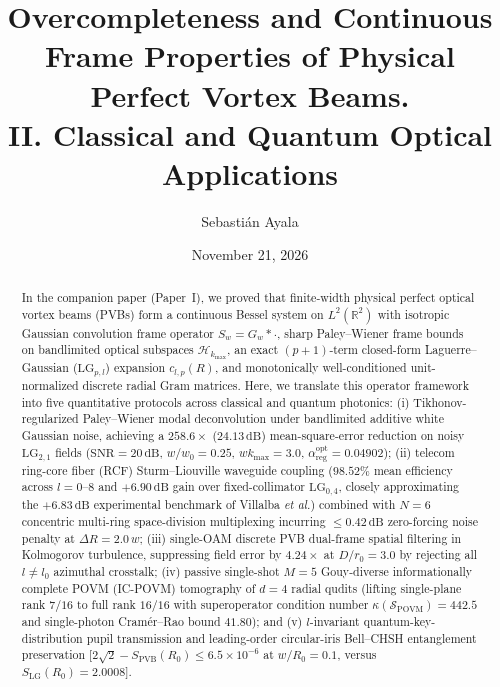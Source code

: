 \documentclass[aps,pra,reprint,nofootinbib,floatfix,longbibliography]{revtex4-2}
\begin{document}
\title{Overcompleteness and Continuous Frame Properties of Physical Perfect Vortex Beams.\\II. Classical and Quantum Optical Applications}

\author{Sebasti\'an Ayala}

\date{November 21, 2026}

\begin{abstract}
In the companion paper (Paper~I), we proved that finite-width physical perfect optical vortex beams (PVBs) form a continuous Bessel system on $L^2(\mathbb{R}^2)$ with isotropic Gaussian convolution frame operator $S_w = G_w * \cdot$, sharp Paley--Wiener frame bounds on bandlimited optical subspaces $\mathcal{H}_{k_{\max}}$, an exact $(p+1)$-term closed-form Laguerre--Gaussian ($\mathrm{LG}_{p,l}$) expansion $c_{l,p}(R)$, and monotonically well-conditioned unit-normalized discrete radial Gram matrices. Here, we translate this operator framework into five quantitative protocols across classical and quantum photonics: (i) Tikhonov-regularized Paley--Wiener modal deconvolution under bandlimited additive white Gaussian noise, achieving a $258.6\times$ ($24.13\,\mathrm{dB}$) mean-square-error reduction on noisy $\mathrm{LG}_{2,1}$ fields ($\mathrm{SNR} = 20\,\mathrm{dB}$, $w/w_0 = 0.25$, $w k_{\max} = 3.0$, $\alpha_{\mathrm{reg}}^{\mathrm{opt}} = 0.04902$); (ii) telecom ring-core fiber (RCF) Sturm--Liouville waveguide coupling ($98.52\%$ mean efficiency across $l = 0\text{--}8$ and $+6.90\,\mathrm{dB}$ gain over fixed-collimator $\mathrm{LG}_{0,4}$, closely approximating the $+6.83\,\mathrm{dB}$ experimental benchmark of Villalba \emph{et al.}) combined with $N = 6$ concentric multi-ring space-division multiplexing incurring $\le 0.42\,\mathrm{dB}$ zero-forcing noise penalty at $\Delta R = 2.0\,w$; (iii) single-OAM discrete PVB dual-frame spatial filtering in Kolmogorov turbulence, suppressing field error by $4.24\times$ at $D/r_0 = 3.0$ by rejecting all $l \neq l_0$ azimuthal crosstalk; (iv) passive single-shot $M = 5$ Gouy-diverse informationally complete POVM (IC-POVM) tomography of $d = 4$ radial qudits (lifting single-plane rank $7/16$ to full rank $16/16$ with superoperator condition number $\kappa(\mathcal{S}_{\mathrm{POVM}}) = 442.5$ and single-photon Cram\'er--Rao bound $41.80$); and (v) $l$-invariant quantum-key-distribution pupil transmission and leading-order circular-iris Bell--CHSH entanglement preservation [$2\sqrt{2} - S_{\mathrm{PVB}}(R_0) \le 6.5\times 10^{-6}$ at $w/R_0 = 0.1$, versus $S_{\mathrm{LG}}(R_0) = 2.0008$].
\end{abstract}
\end{document}
